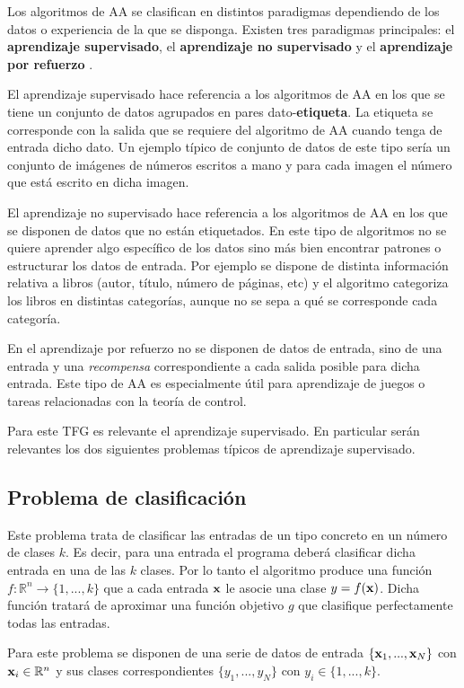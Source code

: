 Los algoritmos de AA se clasifican en distintos paradigmas dependiendo de los datos o experiencia de la que se disponga. Existen tres paradigmas principales: el \textbf{aprendizaje supervisado}, el \textbf{aprendizaje no supervisado} y el \textbf{aprendizaje por refuerzo} \cite{Mostafa2012,Goodfellow-et-al-2016}.

El aprendizaje supervisado hace referencia a los algoritmos de AA en los que se tiene un conjunto de datos agrupados en pares dato-\textbf{etiqueta}. La etiqueta se corresponde con la salida que se requiere del algoritmo de AA cuando tenga de entrada dicho dato. Un ejemplo típico de conjunto de datos de este tipo sería un conjunto de imágenes de números escritos a mano y para cada imagen el número que está escrito en dicha imagen.

El aprendizaje no supervisado hace referencia a los algoritmos de AA en los que se disponen de datos que no están etiquetados. En este tipo de algoritmos no se quiere aprender algo específico de los datos sino más bien encontrar patrones o estructurar los datos de entrada. Por ejemplo se dispone de distinta información relativa a libros (autor, título, número de páginas, etc) y el algoritmo categoriza los libros en distintas categorías, aunque no se sepa a qué se corresponde cada categoría.

En el aprendizaje por refuerzo no se disponen de datos de entrada, sino de una entrada y una \textit{recompensa} correspondiente a cada salida posible para dicha entrada. Este tipo de AA es especialmente útil para aprendizaje de juegos o tareas relacionadas con la teoría de control.

Para este TFG es relevante el aprendizaje supervisado. En particular serán relevantes los dos siguientes problemas típicos de aprendizaje supervisado.

\subsection{Problema de clasificación}
Este problema trata de clasificar las entradas de un tipo concreto en un número de clases $k$. Es decir, para una entrada el programa deberá clasificar dicha entrada en una de las $k$ clases. Por lo tanto el algoritmo produce una función $f:\mathbb{R}^n \rightarrow \{1,...,k\}$ que a cada entrada $\textnormal{\textbf{x}}$ le asocie una clase $y = f(\textnormal{\textbf{x}})$. Dicha función tratará de aproximar una función objetivo $g$ que clasifique perfectamente todas las entradas.

Para este problema se disponen de una serie de datos de entrada $\{\textnormal{\textbf{x}}_1,...,\textnormal{\textbf{x}}_N\}$ con $\textnormal{\textbf{x}}_i\in\mathbb{R}^n$ y sus clases correspondientes $\{y_1,...,y_N\}$ con $y_i \in \{1,...,k\}$. 

